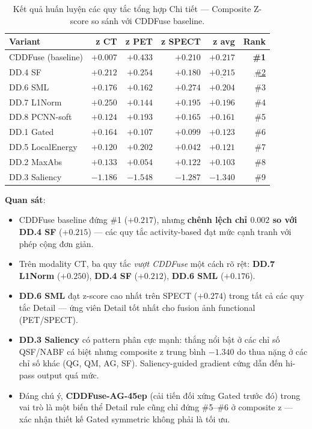 \documentclass[12pt,a4paper]{article}
\begin{document}
\begin{table}[h]
\centering
\small
\setlength{\tabcolsep}{5pt}
\caption{Kết quả huấn luyện các quy tắc tổng hợp Chi tiết --- Composite Z-score so sánh với CDDFuse baseline.}
\begin{tabular}{lrrrrr}
\toprule
\textbf{Variant} & \textbf{z CT} & \textbf{z PET} & \textbf{z SPECT} & \textbf{z avg} & \textbf{Rank} \\
\midrule
CDDFuse (baseline)       & $+0.007$ & $+0.433$ & $+0.210$ & $\mathbf{+0.217}$ & \textbf{\#1} \\
DD.4 SF                  & $+0.212$ & $+0.254$ & $+0.180$ & $\underline{+0.215}$ & \underline{\#2} \\
DD.6 SML                 & $+0.176$ & $+0.162$ & $+0.274$ & $+0.204$ & \#3 \\
DD.7 L1Norm              & $+0.250$ & $+0.144$ & $+0.195$ & $+0.196$ & \#4 \\
DD.8 PCNN-soft           & $+0.124$ & $+0.193$ & $+0.165$ & $+0.161$ & \#5 \\
DD.1 Gated               & $+0.164$ & $+0.107$ & $+0.099$ & $+0.123$ & \#6 \\
DD.5 LocalEnergy         & $+0.120$ & $+0.202$ & $+0.042$ & $+0.121$ & \#7 \\
DD.2 MaxAbs              & $+0.133$ & $+0.054$ & $+0.122$ & $+0.103$ & \#8 \\
DD.3 Saliency            & $-1.186$ & $-1.548$ & $-1.287$ & $-1.340$ & \#9 \\
\bottomrule
\end{tabular}
\end{table}

\textbf{Quan sát}:
\begin{itemize}\itemsep0pt
    \item CDDFuse baseline đứng \#1 ($+0.217$), nhưng \textbf{chênh lệch chỉ $0.002$ so với DD.4 SF} ($+0.215$) --- các quy tắc activity-based đạt mức cạnh tranh với phép cộng đơn giản.
    \item Trên modality CT, ba quy tắc \emph{vượt CDDFuse} một cách rõ rệt: \textbf{DD.7 L1Norm} ($+0.250$), \textbf{DD.4 SF} ($+0.212$), \textbf{DD.6 SML} ($+0.176$).
    \item \textbf{DD.6 SML} đạt z-score cao nhất trên SPECT ($+0.274$) trong tất cả các quy tắc Detail --- ứng viên Detail tốt nhất cho fusion ảnh functional (PET/SPECT).
    \item \textbf{DD.3 Saliency} có pattern phân cực mạnh: thắng nổi bật ở các chỉ số QSF/NABF cá biệt nhưng composite z trung bình $-1.340$ do thua nặng ở các chỉ số khác (QG, QM, AG, SF). Saliency-guided gradient cứng dẫn đến hi-pass output quá mức.
    \item Đáng chú ý, \textbf{CDDFuse-AG-45ep} (cải tiến đối xứng Gated trước đó) trong vai trò là một biến thể Detail rule cũng chỉ đứng \#5--\#6 ở composite z --- xác nhận thiết kế Gated symmetric không phải là tối ưu.
\end{itemize}
\end{document}
